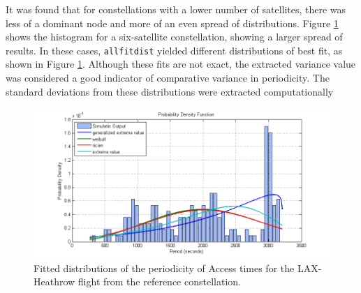 It was found that for constellations with a lower number of satellites, there was less of a dominant node and more of an even spread of distributions. Figure \ref{fig:allfitdist_Heathrow6sat} shows the histogram for a six-satellite constellation, showing a larger spread of results. In these cases, \verb|allfitdist| yielded different distributions of best fit, as shown in Figure \ref{fig:allfitdist_Heathrow6sat}. Although these fits are not exact, the extracted variance value was considered a good indicator of comparative variance in periodicity. The standard deviations from these distributions were extracted computationally


\begin{figure}[htbp]
	\centering
	\includegraphics[scale = 0.8]{Pictures/allfitdist_Heathrow6sat.png}
	
	\caption{Fitted distributions of the periodicity of Access times for the LAX-Heathrow flight from the reference constellation. }
	\label{fig:allfitdist_Heathrow6sat}
\end{figure} 